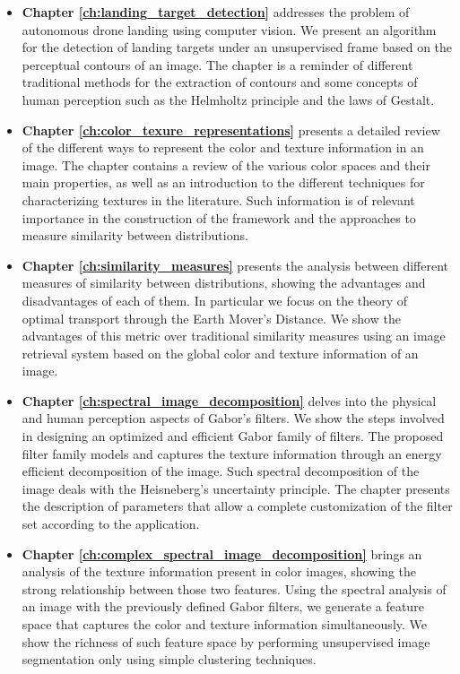 \begin{itemize}
	\item \textbf{Chapter \ref{ch:landing_target_detection}} addresses the problem of autonomous drone landing using computer vision. We present an algorithm for the detection of landing targets under an unsupervised frame based on the perceptual contours of an image. The chapter is a reminder of different traditional methods for the extraction of contours and some concepts of human perception such as the Helmholtz principle and the laws of Gestalt. 
	
	\item \textbf{Chapter \ref{ch:color_texure_representations}} presents a detailed review of the different ways to represent the color and texture information in an image. The chapter contains a review of the various color spaces and their main properties, as well as an introduction to the different techniques for characterizing textures in the literature. Such information is of relevant importance in the construction of the framework and the approaches to measure similarity between distributions.
	
	\item \textbf{Chapter \ref{ch:similarity_measures}} presents the analysis between different measures of similarity between distributions, showing the advantages and disadvantages of each of them. In particular we focus on the theory of optimal transport through the Earth Mover's Distance. We show the advantages of this metric over traditional similarity measures using an image retrieval system based on the global color and texture information of an image.
	
	\item \textbf{Chapter \ref{ch:spectral_image_decomposition}} delves into the physical and human perception aspects of Gabor's filters. We show the steps involved in designing an optimized and efficient Gabor family of filters. The proposed filter family models and captures the texture information through an energy efficient decomposition of the image. Such spectral decomposition of the image deals with the Heisneberg’s uncertainty principle. The chapter presents the description of parameters that allow a complete customization of the filter set according to the application.
	
	\item \textbf{Chapter \ref{ch:complex_spectral_image_decomposition}} brings an analysis of the texture information present in color images, showing the strong relationship between those two features. Using the spectral analysis of an image with the previously defined Gabor filters, we generate a feature space that captures the color and texture information simultaneously. We show the richness of such feature space by performing unsupervised image segmentation only using simple clustering techniques.
	

\end{itemize}
